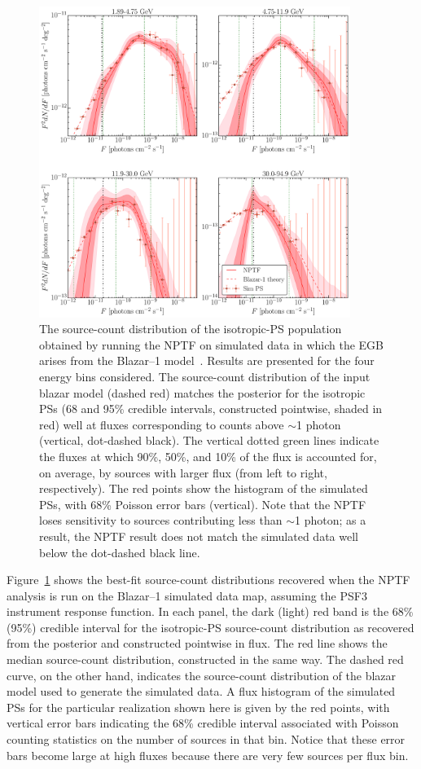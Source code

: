 \begin{figure}[tbhp] 
   \centering
   \includegraphics[width=0.9\textwidth]{ch-igrb/plots/bl1-dnds.pdf} 
   \caption{The source-count distribution of the isotropic-PS population obtained by running the NPTF on simulated data in which the EGB arises from the Blazar--1 model~\cite{Ajello:2015mfa}.  Results are presented for the four energy bins considered.  The source-count distribution of the input blazar model (dashed red) matches the posterior for the isotropic PSs (68 and 95\% credible intervals, constructed pointwise, shaded in red) well at fluxes corresponding to counts above $\sim$1 photon (vertical, dot-dashed black).  The vertical dotted green lines indicate the fluxes at which 90\%, 50\%, and 10\% of the flux is accounted for, on average, by sources with larger flux (from left to right, respectively).  The red points show the histogram of the simulated PSs, with 68\% Poisson error bars (vertical).  Note that the NPTF loses sensitivity to sources contributing less than $\sim$1 photon; as a result, the NPTF result does not match the simulated data well below the dot-dashed black line.  }
   \label{fig:bl1dnds}
\end{figure}

Figure~\ref{fig:bl1dnds} shows the best-fit source-count distributions recovered when the NPTF analysis is run on the Blazar--1 simulated data map, assuming the PSF3 instrument response function.  In each panel, the dark (light) red band is the 68\% (95\%) credible interval for the isotropic-PS source-count distribution as recovered from the posterior and  constructed pointwise in flux. The red line shows the median source-count distribution, constructed in the same way. The dashed red curve, on the other hand, indicates the source-count distribution of the blazar model used to generate the simulated data.  A flux histogram of the simulated PSs for the particular realization shown here is given by the red points, with vertical error bars indicating the 68\% credible interval associated with Poisson counting statistics on the number of sources in that bin.  Notice that these error bars become large at high fluxes because there are very few sources per flux bin. 

